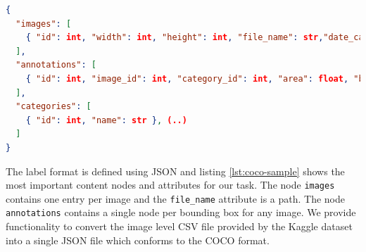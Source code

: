 \begin{minipage}{\linewidth}
	\begin{lstlisting}[language=json,firstnumber=1, caption={Basic COCO annotation format in \autocite{lin_microsoft_2015}.}, captionpos=b, label={lst:coco-sample}]
{
  "images": [
    { "id": int, "width": int, "height": int, "file_name": str,"date_captured": datetime }, (..)
  ], 
  "annotations": [
    { "id": int, "image_id": int, "category_id": int, "area": float, "bbox": [x,y,width,height] }, (..)
  ],
  "categories": [
    { "id": int, "name": str }, (..)
  ]
}
	\end{lstlisting}
\end{minipage}

The label format is defined using JSON and listing \ref{lst:coco-sample} shows the most important content nodes and attributes for our task.
The node \texttt{images} contains one entry per image and the \texttt{file\_name} attribute is a path. The node \texttt{annotations} contains a single node per bounding box for any image.
We provide functionality to convert the image level CSV file provided by the Kaggle dataset into a single JSON file which conforms to the \ac{COCO} format.

